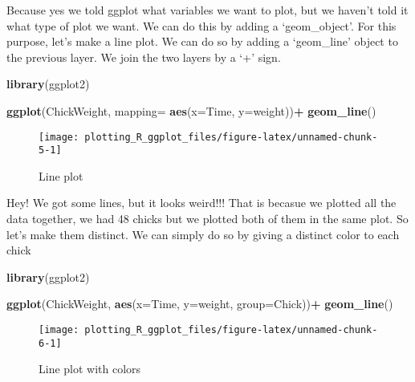 \documentclass[
]{book}
\newenvironment{Shaded}{\begin{snugshade}}{\end{snugshade}}
\newcommand{\DataTypeTok}[1]{\textcolor[rgb]{0.13,0.29,0.53}{#1}}
\newcommand{\KeywordTok}[1]{\textcolor[rgb]{0.13,0.29,0.53}{\textbf{#1}}}
\newcommand{\NormalTok}[1]{#1}
\newcommand{\OperatorTok}[1]{\textcolor[rgb]{0.81,0.36,0.00}{\textbf{#1}}}
\newcommand{\StringTok}[1]{\textcolor[rgb]{0.31,0.60,0.02}{#1}}
\begin{document}
Because yes we told ggplot what variables we want to plot, but we haven't told it what type of plot we want.
We can do this by adding a `geom\_object'. For this purpose, let's make a line plot. We can do so by adding a `geom\_line' object to the previous layer. We join the two layers by a `+' sign.

\begin{Shaded}
\begin{Highlighting}[]
\KeywordTok{library}\NormalTok{(ggplot2)}

\KeywordTok{ggplot}\NormalTok{(ChickWeight, }\DataTypeTok{mapping=} \KeywordTok{aes}\NormalTok{(}\DataTypeTok{x=}\NormalTok{Time, }\DataTypeTok{y=}\NormalTok{weight))}\OperatorTok{+}
\StringTok{  }\KeywordTok{geom_line}\NormalTok{()}
\end{Highlighting}
\end{Shaded}

\begin{figure}

{\centering \texttt{[image: plotting\_R\_ggplot\_files/figure-latex/unnamed-chunk-5-1]} 

}

\caption{Line plot}\label{fig:unnamed-chunk-5}
\end{figure}

Hey! We got some lines, but it looks weird!!!
That is becasue we plotted all the data together, we had 48 chicks but we plotted both of them in the same plot. So let's make them distinct. We can simply do so by giving a distinct color to each chick

\begin{Shaded}
\begin{Highlighting}[]
\KeywordTok{library}\NormalTok{(ggplot2)}

\KeywordTok{ggplot}\NormalTok{(ChickWeight, }\KeywordTok{aes}\NormalTok{(}\DataTypeTok{x=}\NormalTok{Time, }\DataTypeTok{y=}\NormalTok{weight, }\DataTypeTok{group=}\NormalTok{Chick))}\OperatorTok{+}
\StringTok{  }\KeywordTok{geom_line}\NormalTok{()}
\end{Highlighting}
\end{Shaded}

\begin{figure}

{\centering \texttt{[image: plotting\_R\_ggplot\_files/figure-latex/unnamed-chunk-6-1]} 

}

\caption{Line plot with colors}\label{fig:unnamed-chunk-6}
\end{figure}
\end{document}
